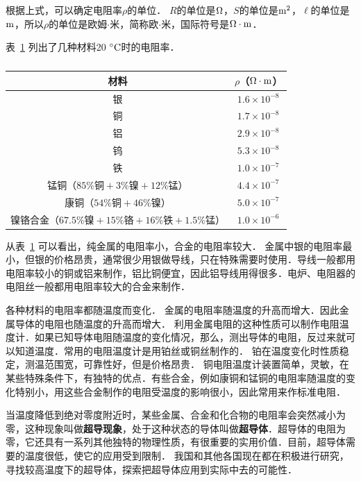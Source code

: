 根据上式，可以确定电阻率$\rho$的单位．
$R$的单位是$\Omega$，$S$的单位是$\text{m}^2$，$\ell$的单位是$\text{m}$，所以$\rho$的单位是欧姆$\cdot$米，简称欧$\cdot$米，国际符号是$\Omega\cdot\text{m}$．

表~\ref{tab_B_7-1} 列出了几种材料20$\;{}^\circ\text{C}$时的电阻率．
\begin{table}[htbp]
	\centering
	\caption{}\label{tab_B_7-1}
    \begin{tabular}{cc}
		\toprule
        材料  & $\rho$（$\Omega\cdot\text{m}$）\\
    	\midrule
		银   & $ 1.6\times 10^{-8}$   \\
		铜  & $ 1.7\times 10^{-8}$   \\
		铝  & $ 2.9\times 10^{-8}$   \\
		钨  & $ 5.3\times 10^{-8}$   \\
		铁  & $ 1.0\times 10^{-7}$   \\
		锰铜（$85\%\text{铜}+3\%\text{镍}+12\%\text{锰}$）  & $ 4.4\times 10^{-7}$   \\
		康铜（$54\%\text{铜}+46\%\text{镍}$） & $ 5.0\times 10^{-7}$   \\
		镍铬合金（$67.5\%\text{镍}+15\%\text{铬}+16\%\text{铁}+1.5\%\text{锰}$） & $1.0 \times 10^{-6}$   \\
    \bottomrule
    \end{tabular}
\end{table}
从表~\ref{tab_B_7-1} 可以看出，纯金属的电阻率小，合金的电阻率较大．
金属中银的电阻率最小，但银的价格昂贵，通常很少用银做导线，只在特殊需要时使用．导线一般都用电阻率较小的铜或铝来制作，铝比铜便宜，因此铝导线用得很多．电炉、电阻器的电阻丝一般都用电阻率较大的合金来制作．

各种材料的电阻率都随温度而变化．
金属的电阻率随温度的升高而增大．因此金属导体的电阻也随温度的升高而增大．
利用金属电阻的这种性质可以制作电阻温度计．如果已知导体电阻随温度的变化情况，那么，测出导体的电阻，反过来就可以知道温度．常用的电阻温度计是用铂丝或铜丝制作的．
铂在温度变化时性质稳定，测温范围宽，可靠性好，但是价格昂贵．
铜电阻温度计装置简单，灵敏，在某些特殊条件下，有独特的优点．有些合金，例如康铜和锰铜的电阻率随温度的变化特别小，用这些合金制作的电阻受温度的影响很小，因此常用来作标准电阻．

当温度降低到绝对零度附近时，某些金属、合金和化合物的电阻率会突然减小为零，这种现象叫做\textbf{超导现象}，处于这种状态的导体叫做\textbf{超导体}．超导体的电阻为零，它还具有一系列其他独特的物理性质，有很重要的实用价值．目前，超导体需要的温度很低，使它的应用受到限制．
我国和其他各国现在都在积极进行研究，寻找较高温度下的超导体，探索把超导体应用到实际中去的可能性．

